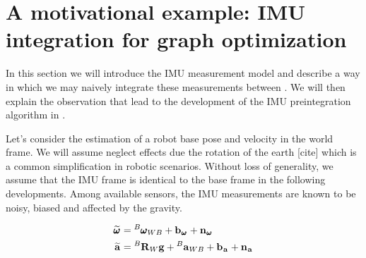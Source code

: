 

  
\section{A motivational example: IMU integration for graph optimization}
In this section we will introduce the IMU measurement model and describe a way in which we may naively integrate these measurements between \keyframes.
We will then explain the observation that lead to the development of the IMU preintegration algorithm in \cite{lupton-09}.

Let's consider the estimation of a robot base pose and velocity in the world frame. We will assume neglect effects due the rotation of the earth [cite] which
is a common simplification in robotic scenarios.  Without loss of generality, we assume that the IMU frame is identical to the base frame in the following developments.
Among available sensors, the IMU measurements are known to be noisy, biased and affected by the gravity.

\begin{equation}
    \begin{split}
    \prescript{}{}{\widetilde{\pmb{\omega}}}_{} &= \prescript{B}{}{\pmb{\omega}}_{WB} + {\bf b}_{\prescript{}{}{\pmb{\omega}}_{}} + {\bf n}_{\prescript{}{}{\pmb{\omega}}_{}} 
    \\
    \prescript{}{}{\widetilde{{\bf a}}}_{}    &= \prescript{B}{}{{\bf R}}_{W} {\bf g} + \prescript{B}{}{{\bf a}}_{WB} + {\bf b}_{\prescript{}{}{{\bf a}}_{}} + {\bf n}_{\prescript{}{}{{\bf a}}_{}} 
    \end{split}
    \label{eq:imu_meas_model}
\end{equation}
    

